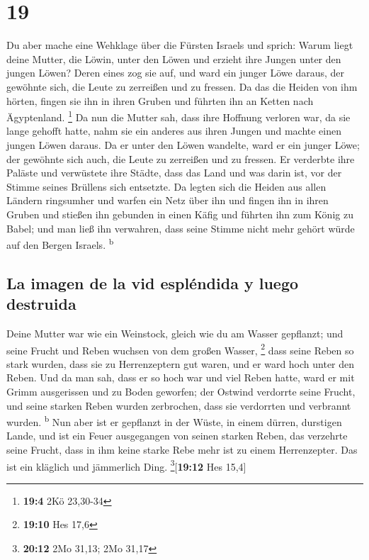 \hypertarget{section-18}{%
\section{19}\label{section-18}}

 Du aber mache eine Wehklage über die Fürsten Israels
 und sprich: Warum liegt deine Mutter, die Löwin, unter
den Löwen und erzieht ihre Jungen unter den jungen Löwen? 
Deren eines zog sie auf, und ward ein junger Löwe daraus, der gewöhnte
sich, die Leute zu zerreißen und zu fressen.  Da das die
Heiden von ihm hörten, fingen sie ihn in ihren Gruben und führten ihn an
Ketten nach Ägyptenland. \footnote{\textbf{19:4} 2Kö 23,30-34}
 Da nun die Mutter sah, dass ihre Hoffnung verloren war,
da sie lange gehofft hatte, nahm sie ein anderes aus ihren Jungen und
machte einen jungen Löwen daraus.  Da er unter den Löwen
wandelte, ward er ein junger Löwe; der gewöhnte sich auch, die Leute zu
zerreißen und zu fressen.  Er verderbte ihre Paläste und
verwüstete ihre Städte, dass das Land und was darin ist, vor der Stimme
seines Brüllens sich entsetzte.  Da legten sich die Heiden
aus allen Ländern ringsumher und warfen ein Netz über ihn und fingen ihn
in ihren Gruben  und stießen ihn gebunden in einen Käfig
und führten ihn zum König zu Babel; und man ließ ihn verwahren, dass
seine Stimme nicht mehr gehört würde auf den Bergen Israels.
\textsuperscript{b}

\hypertarget{la-imagen-de-la-vid-espluxe9ndida-y-luego-destruida}{%
\subsection{La imagen de la vid espléndida y luego
destruida}\label{la-imagen-de-la-vid-espluxe9ndida-y-luego-destruida}}

 Deine Mutter war wie ein Weinstock, gleich wie du am
Wasser gepflanzt; und seine Frucht und Reben wuchsen von dem großen
Wasser, \footnote{\textbf{19:10} Hes 17,6}  dass seine
Reben so stark wurden, dass sie zu Herrenzeptern gut waren, und er ward
hoch unter den Reben. Und da man sah, dass er so hoch war und viel Reben
hatte,  ward er mit Grimm ausgerissen und zu Boden
geworfen; der Ostwind verdorrte seine Frucht, und seine starken Reben
wurden zerbrochen, dass sie verdorrten und verbrannt wurden.
\textsuperscript{b}  Nun aber ist er gepflanzt in der
Wüste, in einem dürren, durstigen Lande,  und ist ein
Feuer ausgegangen von seinen starken Reben, das verzehrte seine Frucht,
dass in ihm keine starke Rebe mehr ist zu einem Herrenzepter. Das ist
ein kläglich und jämmerlich Ding. \footnote{\textbf{20:12} 2Mo 31,13;
  2Mo 31,17}{[}\textbf{19:12} Hes 15,4{]}

